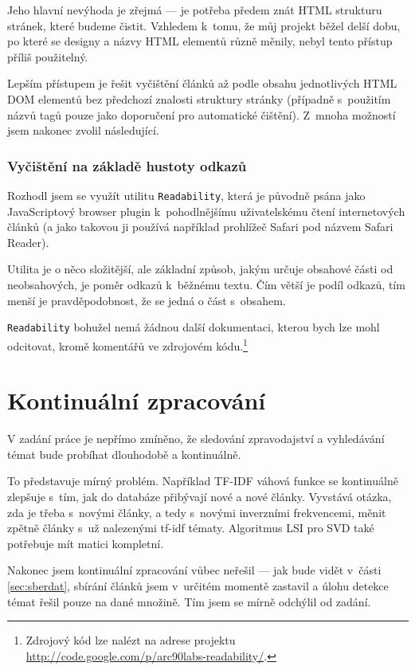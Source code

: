 \documentclass[12pt,a4paper]{report}
\begin{document}
Jeho hlavní nevýhoda je zřejmá --- je potřeba předem znát HTML strukturu stránek, které budeme čistit. Vzhledem k~tomu, že můj projekt běžel delší dobu, po které se designy a názvy HTML elementů různě měnily, nebyl tento přístup příliš použitelný.

Lepším přístupem je řešit vyčištění článků až podle obsahu jednotlivých HTML DOM elementů bez předchozí znalosti struktury stránky (případně s~použitím názvů tagů pouze jako doporučení pro automatické čištění). Z~mnoha možností jsem nakonec zvolil následující.

\subsubsection{Vyčištění na základě hustoty odkazů}
Rozhodl jsem se využít utilitu \texttt{Readability}, která je původně psá\-na ja\-ko Java\-Scri\-pto\-vý brow\-ser plu\-g\-in k~pohodlnějšímu uživatelskému čtení in\-ter\-net\-o\-vých člán\-ků (a jako takovou ji používá například prohlížeč Safari pod názvem Safari Reader). 

Utilita je o něco složitější, ale základní způsob, jakým určuje obsahové části od neobsahových, je poměr odkazů k~běžnému textu. Čím větší je podíl odkazů, tím menší je pravděpodobnost, že se jedná o část s~obsahem. 

\texttt{Readability} bohužel nemá žádnou další dokumentaci, kterou bych lze mohl odcitovat, kromě komentářů ve zdrojovém kódu.\footnote{Zdrojový kód lze nalézt na adrese projektu \\ \hspace*{1.5em} \url{http://code.google.com/p/arc90labs-readability/}.}


\section{Kontinuální zpracování}
V zadání práce je nepřímo zmíněno, že sledování zpravodajství a vyhledávání témat bude probíhat dlouhodobě a kontinuálně.

To představuje mírný problém. Například TF-IDF váhová funkce se kontinuálně zlepšuje s~tím, jak do databáze přibývají nové a nové články. Vyvstává otázka, zda je třeba s~novými články, a tedy s~novými inverzními frekvencemi, měnit zpětně články s~už nalezenými tf-idf tématy. Algoritmus LSI pro SVD také potřebuje mít matici kompletní.

Nakonec jsem kontinuální zpracování vůbec neřešil --- jak bude vidět v~části \ref{sec:sberdat}, sbírání článků jsem v~určitém momentě zastavil a úlohu detekce témat řešil pouze na dané množině. Tím jsem se mírně odchýlil od zadání.
\end{document}
